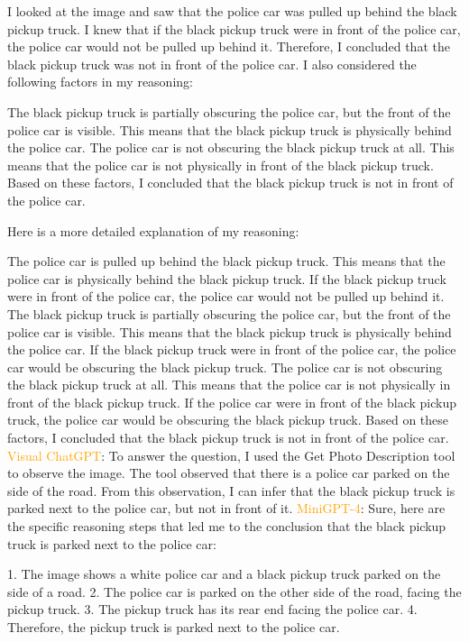 \begin{enumerate}
        I looked at the image and saw that the police car was pulled up behind the black pickup truck.
        I knew that if the black pickup truck were in front of the police car, the police car would not be pulled up behind it.
        Therefore, I concluded that the black pickup truck was not in front of the police car.
        I also considered the following factors in my reasoning:
        
        The black pickup truck is partially obscuring the police car, but the front of the police car is visible. This means that the black pickup truck is physically behind the police car.
        The police car is not obscuring the black pickup truck at all. This means that the police car is not physically in front of the black pickup truck.
        Based on these factors, I concluded that the black pickup truck is not in front of the police car.
        
        Here is a more detailed explanation of my reasoning:
        
        The police car is pulled up behind the black pickup truck. This means that the police car is physically behind the black pickup truck. If the black pickup truck were in front of the police car, the police car would not be pulled up behind it.
        The black pickup truck is partially obscuring the police car, but the front of the police car is visible. This means that the black pickup truck is physically behind the police car. If the black pickup truck were in front of the police car, the police car would be obscuring the black pickup truck.
        The police car is not obscuring the black pickup truck at all. This means that the police car is not physically in front of the black pickup truck. If the police car were in front of the black pickup truck, the police car would be obscuring the black pickup truck.
        Based on these factors, I concluded that the black pickup truck is not in front of the police car.
        \subitem \textcolor{orange}{Visual ChatGPT}: To answer the question, I used the Get Photo Description tool to observe the image. The tool observed that there is a police car parked on the side of the road. From this observation, I can infer that the black pickup truck is parked next to the police car, but not in front of it.
        \subitem \textcolor{orange}{MiniGPT-4}: Sure, here are the specific reasoning steps that led me to the conclusion that the black pickup truck is parked next to the police car:

        1. The image shows a white police car and a black pickup truck parked on the side of a road.
        2. The police car is parked on the other side of the road, facing the pickup truck.
        3. The pickup truck has its rear end facing the police car.
        4. Therefore, the pickup truck is parked next to the police car.
        

\end{enumerate}
